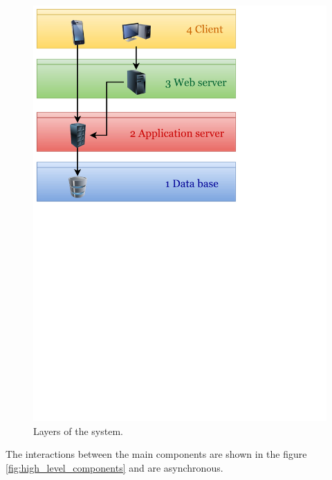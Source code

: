 \begin{figure}[h]
\centering
\includegraphics[width=\textwidth]{diagrams/layers.pdf}
\caption{Layers of the system.}
\label{fig:layers}
\end{figure}

The interactions between the main components are shown in the figure \ref{fig:high_level_components} and are asynchronous.

